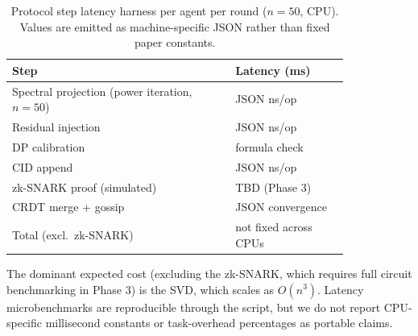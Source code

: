 \begin{table}[t]
  \centering
  \caption{Protocol step latency harness per agent per round ($n{=}50$, CPU).
    Values are emitted as machine-specific JSON rather than fixed paper constants.}
  \label{tab:latency}
  \footnotesize
  \begin{tabular}{p{0.55\linewidth}p{0.28\linewidth}}
    \toprule
    Step & Latency (ms) \\
    \midrule
    Spectral projection (power iteration, $n{=}50$) & JSON ns/op \\
    Residual injection & JSON ns/op \\
    DP calibration  & formula check \\
    CID append & JSON ns/op \\
    zk-SNARK proof (simulated) & TBD (Phase 3) \\
    CRDT merge + gossip & JSON convergence \\
    \midrule
    Total (excl.\ zk-SNARK) & not fixed across CPUs \\
    \bottomrule
  \end{tabular}
\end{table}

The dominant expected cost (excluding the zk-SNARK, which requires full circuit
benchmarking in Phase 3) is the SVD, which scales as $O(n^3)$.  Latency microbenchmarks
are reproducible through the script, but we do not report CPU-specific millisecond
constants or task-overhead percentages as portable claims.
